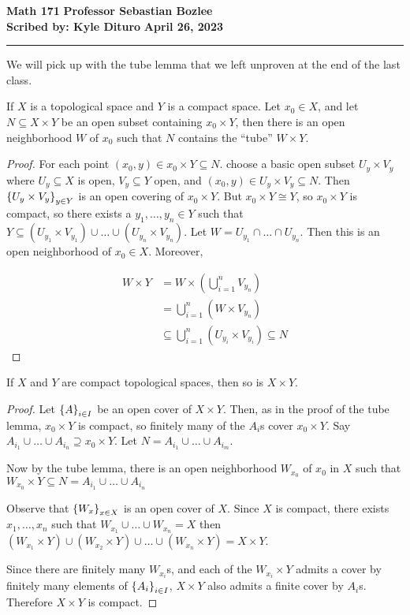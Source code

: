 \documentclass[12pt, twosided]{article}
\begin{document}
\noindent \textbf{Math 171} \hfill \textbf{Professor Sebastian Bozlee} \\
\textbf{Scribed by: Kyle Dituro} \hfill \textbf{April 26, 2023}\hrule
\vspace{.2in}
We will pick up with the tube lemma that we left unproven at the end of the last class.
\begin{lm}
  If \(X\) is a topological space and \(Y\) is a compact space. Let \(x_0 \in X\), and let \(N \subseteq X \times Y\) be an open subset containing \(x_0 \times Y\), then there is an open neighborhood \(W\) of \(x_0\) such that \(N\) contains the ``tube'' \(W \times Y\).
\end{lm}
\begin{proof}
  For each point \((x_0, y) \in x_0 \times Y \subseteq N\). choose a basic open subset \(U_y \times V_y\) where \(U_y \subseteq X\) is open, \(V_y \subseteq Y\) open, and \((x_0, y) \in U_y \times V_y \subseteq N\). Then \(\left\{ U_y \times V_y \right\}_{y \in Y}\) is an open covering of \(x_0 \times Y\). But \(x_0 \times Y \cong Y\), so \(x_0 \times Y\) is compact, so there exists a \(y_1, \ldots, y_n \in Y\) such that \(Y \subseteq (U_{y_1} \times V_{y_1})\cup \ldots \cup (U_{y_n} \times V_{y_n})\). Let \(W = U_{y_1} \cap \ldots \cap U_{y_n}\). Then this is an open neighborhood of \(x_0 \in X\). Moreover,

  \begin{align*}
    W \times Y &= W \times \left(\bigcup_{i=1}^nV_{y_n}\right) \\
               &=\bigcup_{i = 1}^n (W \times V_{y_n}) \\
               &\subseteq \bigcup_{i = 1}^n ( U_{y_i} \times V_{y_i}) \subseteq N
  \end{align*}
\end{proof}

\begin{thm}
  If \(X\) and \(Y\) are compact topological spaces, then so is \(X \times Y\).
\end{thm}

\begin{proof}
  Let \(\left\{ A \right\}_{i \in I}\) be an open cover of \(X \times Y\). Then, as in the proof of the tube lemma, \(x_0 \times Y\) is compact, so finitely many of the \(A_i\)s cover \(x_0 \times Y\). Say \(A_{i_1} \cup \ldots \cup A_{i_n} \supseteq x_0 \times Y\). Let \(N = A_{i_1} \cup \ldots \cup A_{i_m}\).

  Now by the tube lemma, there is an open neighborhood \(W_{x_0}\) of \(x_0\) in \(X\) such that \(W_{x_0} \times Y\subseteq N = A_{i_1} \cup \ldots\cup A_{i_n}\)

  Observe that  \(\left\{ W_x \right\}_{x \in X}\) is an open cover of \(X\). Since \(X\) is compact, there exists \(x_1, \ldots, x_n\) such that \(W_{x_1} \cup \ldots \cup W_{x_n} = X\) then \((W_{x_1} \times Y) \cup (W_{x_2} \times Y) \cup \ldots \cup (W_{x_n} \times Y) = X \times Y\).

  Since there are finitely many \(W_{x_i}\)s, and each of the \(W_{x_i} \times Y\) admits a cover by finitely many elements of \(\left\{ A_i \right\}_{i \in I}\), \(X \times Y\) also admits a finite cover by \(A_i\)s. Therefore \(X \times Y\) is compact.
\end{proof}
\end{document}
